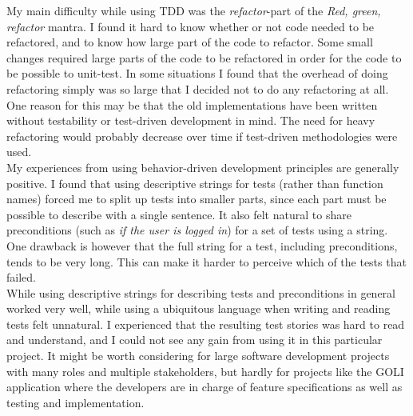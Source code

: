 My main difficulty while using TDD was the \emph{refactor}-part of the
\emph{Red, green, refactor} mantra. I found it hard to know whether or
not code needed to be refactored, and to know how large part of the code
to refactor. Some small changes required large parts of the code to be
refactored in order for the code to be possible to unit-test. In some
situations I found that the overhead of doing refactoring simply was so
large that I decided not to do any refactoring at all. One reason for
this may be that the old implementations have been written without
testability or test-driven development in mind. The need for heavy
refactoring would probably decrease over time if test-driven
methodologies were used.\\

My experiences from using behavior-driven development principles are
generally positive. I found that using descriptive strings for tests
(rather than function names) forced me to split up tests into smaller
parts, since each part must be possible to describe with a single
sentence. It also felt natural to share preconditions (such as \emph{if
the user is logged in}) for a set of tests using a string. One drawback
is however that the full string for a test, including preconditions,
tends to be very long. This can make it harder to perceive which of the
tests that failed.\\

While using descriptive strings for describing tests and preconditions
in general worked very well, while using a ubiquitous language when
writing and reading tests felt unnatural. I experienced that the
resulting test stories was hard to read and understand, and I could not
see any gain from using it in this particular project. It might be worth
considering for large software development projects with many roles and
multiple stakeholders, but hardly for projects like the GOLI application
where the developers are in charge of feature specifications as well as
testing and implementation.\\
